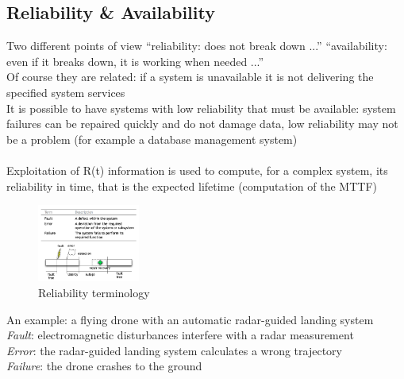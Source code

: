 \documentclass[10pt, oneside]{article}
\begin{document}
\subsection{Reliability \& Availability}
Two different points of view
“reliability: does not break down ...”
“availability: even if it breaks down, it is working when needed ...”\\
Of course they are related: if a system is unavailable it is not delivering the specified system services\\
It is possible to have systems with low reliability that must be available: system failures can be repaired quickly and do not damage data, low reliability may not be a problem (for example a database management system)\\\\Exploitation of R(t) information is used to compute, for a complex system, its reliability in time, that is the expected lifetime
(computation of the MTTF)\begin{multicols}{2}
    \begin{figure}[H]
        \begin{center}
        \includegraphics[width=0.3\textwidth]{img/img85.png}
        \caption{Reliability terminology}
        \end{center}
    \end{figure}
    \columnbreak
    An example: a flying drone with an automatic radar-guided landing system \\{\sl Fault}: electromagnetic disturbances interfere with a radar measurement\\{\sl Error}: the radar-guided landing system calculates a wrong trajectory \\{\sl Failure}: the drone crashes to the ground
\end{multicols}
\end{document}
